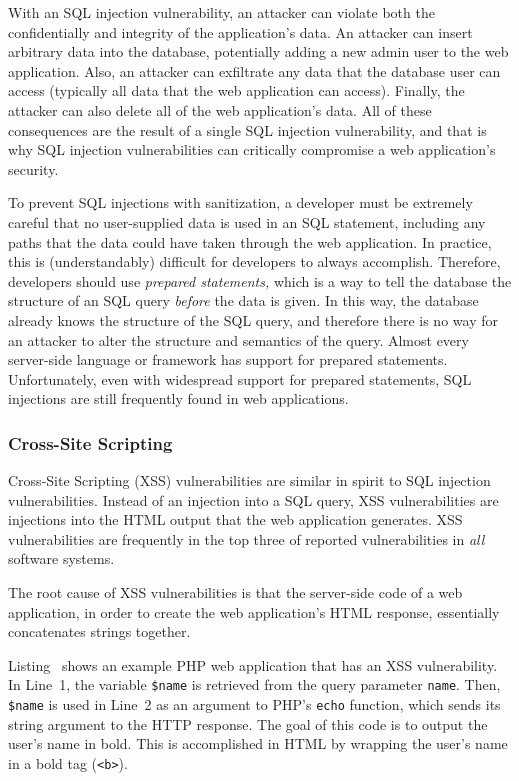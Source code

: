 With an SQL injection vulnerability, an attacker can violate both the
confidentially and integrity of the application's data. An attacker
can insert arbitrary data into the database, potentially adding a new
admin user to the web application. Also, an attacker can exfiltrate
any data that the database user can access (typically all data that
the web application can access). Finally, the attacker can also delete
all of the web application's data. All of these consequences are the
result of a single SQL injection vulnerability, and that is why SQL
injection vulnerabilities can critically compromise a web
application's security.

To prevent SQL injections with sanitization, a developer must be
extremely careful that no user-supplied data is used in an SQL
statement, including any paths that the data could have taken through
the web application. In practice, this is (understandably) difficult
for developers to always accomplish. Therefore, developers should use
\emph{prepared statements,} which is a way to tell the database the
structure of an SQL query \emph{before} the data is given. In this
way, the database already knows the structure of the SQL query, and
therefore there is no way for an attacker to alter the structure and
semantics of the query. Almost every server-side language or framework
has support for prepared statements. Unfortunately, even with
widespread support for prepared statements, SQL injections are still
frequently found in web applications.

\subsubsection{Cross-Site Scripting}

Cross-Site Scripting (XSS) vulnerabilities are similar in spirit to
SQL injection vulnerabilities. Instead of an injection into a SQL
query, XSS vulnerabilities are injections into the HTML output that
the web application generates. XSS vulnerabilities are frequently in
the top three of reported vulnerabilities in \emph{all} software
systems.

The root cause of XSS vulnerabilities is that the server-side code of
a web application, in order to create the web application's HTML
response, essentially concatenates strings together.



Listing~ shows an example PHP web application
that has an XSS vulnerability. In Line~1, the variable \texttt{\$name}
is retrieved from the query parameter \texttt{name}. Then,
\texttt{\$name} is used in Line~2 as an argument to PHP's
\texttt{echo} function, which sends its string argument to the HTTP
response. The goal of this code is to output the user's name in bold.
This is accomplished in HTML by wrapping the user's name in a bold tag
(\texttt{<b>}).


